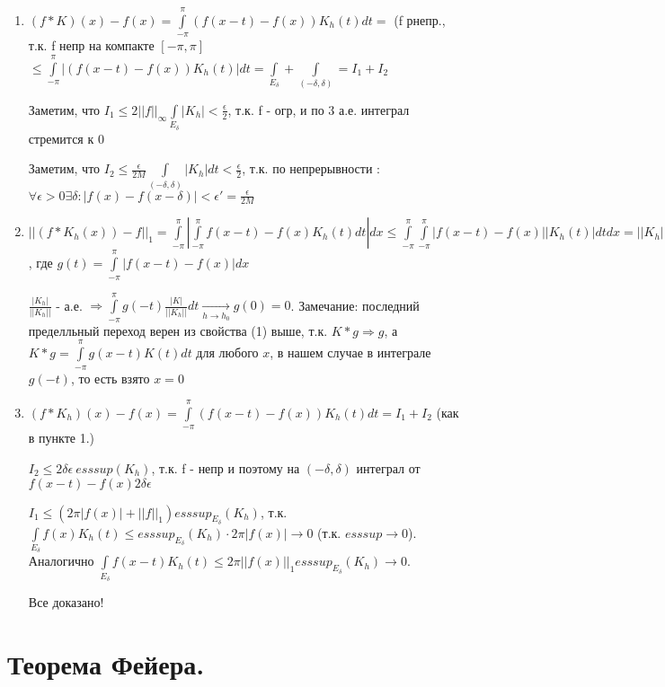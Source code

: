 \documentclass[paper=a4, fontsize=17pt]{article}
\begin{document}
	\begin{enumerate}
		\item $(f*K)(x) - f(x) =  \int\limits_{-\pi}^{\pi} (f(x-t)-f(x))K_h(t)dt = $ (f рнепр., т.к. f непр на компакте $[-\pi, \pi]$  $\leq \int\limits_{-\pi}^{\pi} |(f(x-t)-f(x))K_h(t)|dt = \int\limits_{E_{\delta}} + \int\limits_{(-\delta, \delta)} = I_1 + I_2$

		Заметим, что $I_1 \leq 2 ||f||_{\infty}\int\limits_{E_{\delta}}|K_h| < \frac{\epsilon}{2}$, т.к. f - огр, и по 3  а.е. интеграл стремится к 0

		Заметим, что $I_2 \leq \frac{\epsilon}{2 M} \int\limits_{(-\delta, \delta)}|K_h|dt < \frac{\epsilon}{2}$, т.к. по непрерывности : $\forall \epsilon > 0 \exists \delta : |f(x) - f(x - \delta)| < \epsilon' = \frac{\epsilon}{2 M}$

		\item $||(f * K_h(x)) - f||_1 = \int\limits_{-\pi}^{\pi} |\int\limits_{-\pi}^{\pi} f(x-t)-f(x)K_h(t)dt|dx \leq \int\limits_{-\pi}^{\pi}\int\limits_{-\pi}^{\pi}|f(x-t)-f(x)||K_h(t)|dtdx = ||K_h||_1 \int\limits_{-\pi}^{\pi}g(-t)\frac{K(t)}{||K_h||_1}dt$, где $g(t) = \int\limits_{-\pi}^{\pi}|f(x-t)-f(x)|dx$

		$\frac{|K_h|}{||K_h||}$ - а.е. $\Rightarrow \int\limits_{-\pi}^{\pi}g(-t)\frac{|K|}{||K_h||}dt \underset{h \rightarrow h_0}{\rightarrow} g(0) = 0 $. Замечание: последний пределльный переход верен из свойства (1) выше, т.к. $K*g \Rightarrow g$, а $K*g = \int\limits_{-\pi}^{\pi}g(x-t)K(t)dt$ для любого $x$, в нашем случае в интеграле $g(-t)$, то есть взято $x = 0$

		\item $(f*K_h)(x) - f(x) = \int\limits_{-\pi}^{\pi} (f(x-t)-f(x))K_h(t)dt = I_1 + I_2$ (как в пункте 1.)

		$I_2 \leq 2 \delta \epsilon ~ esssup(K_h) $, т.к. f - непр и поэтому на $(-\delta, \delta)$ интеграл от $f(x-t)-f(x) 2 \delta \epsilon$

		$I_1 \leq (2 \pi |f(x)| + ||f||_1 ) esssup_{E_{\delta}}(K_h) $, т.к. $\int\limits_{E_{\delta}} f(x)K_h(t) \leq esssup_{E_{\delta}}(K_h) \cdot 2 \pi |f(x)| \rightarrow 0$ (т.к. $esssup \rightarrow 0$). Аналогично $\int\limits_{E_{\delta}} f(x-t)K_h(t) \leq 2 \pi ||f(x)||_1 esssup_{E_{\delta}}(K_h) \rightarrow 0$.

		Все доказано!

	\end{enumerate}
\section{Теорема Фейера.}
\end{document}
